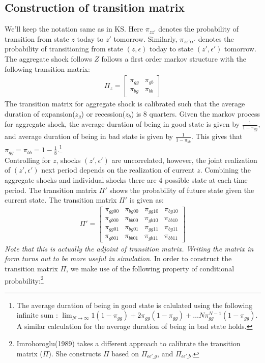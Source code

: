 \documentclass[12pt]{article}
\begin{document}
\subsection*{Construction of transition matrix}
We'll keep the notation same as in KS. Here $\pi_{zz'}$ denotes the probability of transition from state $z$ today to $z'$ tomorrow. Similarly, $\pi_{zz'\epsilon\epsilon'}$ denotes the probability of transitioning from state $(z, \epsilon)$ today to state $(z', \epsilon')$ tomorrow. The aggregate shock follows $Z$ follows a first order markov structure with the following transition matrix:
\begin{align*}
\Pi_z = \begin{bmatrix}
\pi_{gg} & \pi_{gb} \\
\pi_{bg} & \pi_{bb}
\end{bmatrix}
\end{align*}
The transition matrix for aggregate shock is calibrated such that the average duration of expansion($z_g$) or recession($z_b$) is 8 quarters. Given the markov process for aggregate shock, the average duration of being in good state is given by $\frac{1}{1-\pi_{gg}}$, and average duration of being in bad state is given by $\frac{1}{1-\pi_{bb}}$. This gives that $\pi_{gg} = \pi_{bb} = 1-\frac{1}{8}.$\footnote{The average duration of being in good state is calulated using the following infinite sum :  $\lim_{N \to \infty} 1(1-\pi_{gg}) + 2\pi_{gg}(1-\pi_{gg}) +\dots N \pi_{gg}^{N-1}(1-\pi_{gg})$. A similar calculation for the average duration of being in bad state holds. }\\
Controlling for $z$, shocks $(z', \epsilon')$ are uncorrelated, however, the joint realization of $(z', \epsilon')$ next period depends on the realization of current $z$. Combining the aggregate shocks and individual shocks there are 4 possible state at each time period. The transition matrix $\Pi'$ shows the probability of future state given the current state.   The transition matrix $\Pi'$ is given as: 
\begin{align*}
\Pi' = \begin{bmatrix}
\pi_{gg00} & \pi_{bg00} & \pi_{gg10} & \pi_{bg10} \\
\pi_{gb00} & \pi_{bb00} & \pi_{gb10} & \pi_{bb10} \\
\pi_{gg01} & \pi_{bg01} & \pi_{gg11} & \pi_{bg11} \\
\pi_{gb01} & \pi_{bb01} & \pi_{gb11} & \pi_{bb11}
\end{bmatrix}
\end{align*}
\textit{Note that this is actually the adjoint of transition matrix. Writing the matrix in form turns out to be more useful in simulation.} In order to construct the transition matrix $\Pi$,  we make use of the following property of conditional probability:\footnote{Imrohoroglu(1989) takes a different approach to calibrate the transition matrix ($\Pi$). She constructs $\Pi$ based on $\Pi_{\epsilon\epsilon'\_g}$, and $\Pi_{\epsilon\epsilon'\_b}$.}
\end{document}
